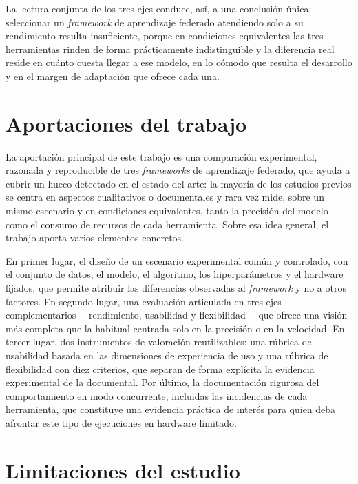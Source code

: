 La lectura conjunta de los tres ejes conduce, así, a una conclusión única: seleccionar un
\textit{framework} de aprendizaje federado atendiendo solo a su rendimiento resulta insuficiente,
porque en condiciones equivalentes las tres herramientas rinden de forma prácticamente
indistinguible y la diferencia real reside en cuánto cuesta llegar a ese modelo, en lo
cómodo que resulta el desarrollo y en el margen de adaptación que ofrece cada una.

\section{Aportaciones del trabajo}
\label{sec:aportaciones}

La aportación principal de este trabajo es una comparación experimental, razonada y
reproducible de tres \textit{frameworks} de aprendizaje federado, que ayuda a cubrir un hueco
detectado en el estado del arte: la mayoría de los estudios previos se centra en
aspectos cualitativos o documentales y rara vez mide, sobre un mismo escenario y en
condiciones equivalentes, tanto la precisión del modelo como el consumo de recursos de
cada herramienta. Sobre esa idea general, el trabajo aporta varios elementos concretos.

En primer lugar, el diseño de un escenario experimental común y controlado, con el
conjunto de datos, el modelo, el algoritmo, los hiperparámetros y el hardware fijados,
que permite atribuir las diferencias observadas al \textit{framework} y no a otros factores. En
segundo lugar, una evaluación articulada en tres ejes complementarios —rendimiento,
usabilidad y flexibilidad— que ofrece una visión más completa que la habitual centrada
solo en la precisión o en la velocidad. En tercer lugar, dos instrumentos de valoración
reutilizables: una rúbrica de usabilidad basada en las dimensiones de experiencia de
uso y una rúbrica de flexibilidad con diez criterios, que separan de forma explícita la
evidencia experimental de la documental. Por último, la documentación rigurosa del
comportamiento en modo concurrente, incluidas las incidencias de cada herramienta, que
constituye una evidencia práctica de interés para quien deba afrontar este tipo de
ejecuciones en hardware limitado.

\section{Limitaciones del estudio}
\label{sec:limitaciones-conclusiones}

